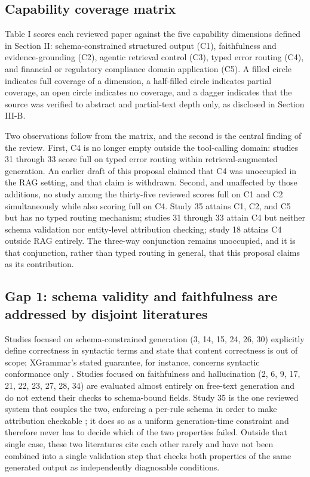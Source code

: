 \documentclass[10pt,twocolumn,letterpaper]{article}
\begin{document}
\subsection{Capability coverage matrix}

Table I scores each reviewed paper against the five capability dimensions defined in Section II: schema-constrained structured output (C1), faithfulness and evidence-grounding (C2), agentic retrieval control (C3), typed error routing (C4), and financial or regulatory compliance domain application (C5). A filled circle indicates full coverage of a dimension, a half-filled circle indicates partial coverage, an open circle indicates no coverage, and a dagger indicates that the source was verified to abstract and partial-text depth only, as disclosed in Section III-B.

Two observations follow from the matrix, and the second is the central finding of the review. First, C4 is no longer empty outside the tool-calling domain: studies 31 through 33 score full on typed error routing within retrieval-augmented generation. An earlier draft of this proposal claimed that C4 was unoccupied in the RAG setting, and that claim is withdrawn. Second, and unaffected by those additions, no study among the thirty-five reviewed scores full on C1 and C2 simultaneously while also scoring full on C4. Study 35 attains C1, C2, and C5 but has no typed routing mechanism; studies 31 through 33 attain C4 but neither schema validation nor entity-level attribution checking; study 18 attains C4 outside RAG entirely. The three-way conjunction remains unoccupied, and it is that conjunction, rather than typed routing in general, that this proposal claims as its contribution.

\subsection{Gap 1: schema validity and faithfulness are addressed by disjoint literatures}

Studies focused on schema-constrained generation (3, 14, 15, 24, 26, 30) explicitly define correctness in syntactic terms and state that content correctness is out of scope; XGrammar's stated guarantee, for instance, concerns syntactic conformance only \cite{xgrammar}. Studies focused on faithfulness and hallucination (2, 6, 9, 17, 21, 22, 23, 27, 28, 34) are evaluated almost entirely on free-text generation and do not extend their checks to schema-bound fields. Study 35 is the one reviewed system that couples the two, enforcing a per-rule schema in order to make attribution checkable \cite{refwalk}; it does so as a uniform generation-time constraint and therefore never has to decide which of the two properties failed. Outside that single case, these two literatures cite each other rarely and have not been combined into a single validation step that checks both properties of the same generated output as independently diagnosable conditions.
\end{document}
